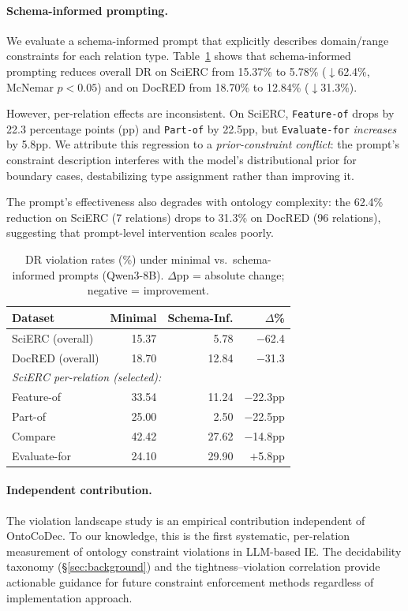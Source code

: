 \documentclass[11pt,a4paper]{article}
\newcommand{\sys}{OntoCoDec\xspace}
\begin{document}
\paragraph{Schema-informed prompting.}
We evaluate a schema-informed prompt that explicitly describes domain/range constraints for each relation type.
Table~\ref{tab:prompting} shows that schema-informed prompting reduces overall DR on SciERC from 15.37\% to 5.78\% ($\downarrow$62.4\%, McNemar $p < 0.05$) and on DocRED from 18.70\% to 12.84\% ($\downarrow$31.3\%).

However, per-relation effects are inconsistent.
On SciERC, \texttt{Feature-of} drops by 22.3 percentage points (pp) and \texttt{Part-of} by 22.5pp, but \texttt{Evaluate-for} \emph{increases} by 5.8pp.
We attribute this regression to a \emph{prior-constraint conflict}: the prompt's constraint description interferes with the model's distributional prior for boundary cases, destabilizing type assignment rather than improving it.

The prompt's effectiveness also degrades with ontology complexity: the 62.4\% reduction on SciERC (7 relations) drops to 31.3\% on DocRED (96 relations), suggesting that prompt-level intervention scales poorly.

\begin{table}[t]
\centering
\caption{DR violation rates (\%) under minimal vs.\ schema-informed prompts (Qwen3-8B). $\Delta$pp = absolute change; negative = improvement.}
\label{tab:prompting}
\small
\begin{tabular}{lrrr}
\toprule
\textbf{Dataset} & \textbf{Minimal} & \textbf{Schema-Inf.} & \textbf{$\Delta$\%} \\
\midrule
SciERC (overall) & 15.37 & 5.78 & $-$62.4 \\
DocRED (overall) & 18.70 & 12.84 & $-$31.3 \\
\midrule
\multicolumn{4}{l}{\textit{SciERC per-relation (selected):}} \\
\quad Feature-of    & 33.54 & 11.24 & $-$22.3pp \\
\quad Part-of       & 25.00 & 2.50  & $-$22.5pp \\
\quad Compare       & 42.42 & 27.62 & $-$14.8pp \\
\quad Evaluate-for  & 24.10 & 29.90 & $+$5.8pp \\
\bottomrule
\end{tabular}
\end{table}

\paragraph{Independent contribution.}
The violation landscape study is an empirical contribution independent of \sys.
To our knowledge, this is the first systematic, per-relation measurement of ontology constraint violations in LLM-based IE.
The decidability taxonomy (\S\ref{sec:background}) and the tightness--violation correlation provide actionable guidance for future constraint enforcement methods regardless of implementation approach.
\end{document}
